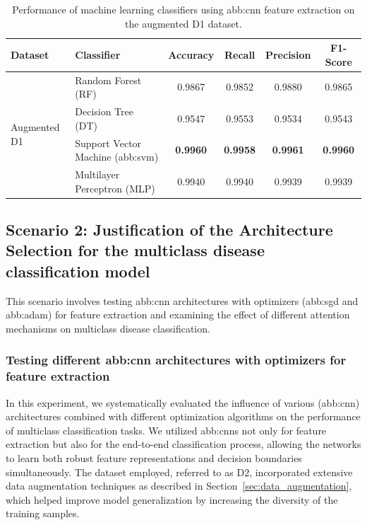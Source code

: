 \begin{table}[H]
    \centering
    \renewcommand{\arraystretch}{1.4}
    \setlength{\tabcolsep}{10pt}
    \caption{Performance of machine learning classifiers using \gls{abb:cnn} feature extraction on the augmented D1 dataset.}
    \label{tab:performance}
    \begin{tabular}{|p{2.5cm}|p{4cm}|c|c|c|c|}
        \hline
        \textbf{Dataset} & \textbf{Classifier} & \textbf{Accuracy} & \textbf{Recall} & \textbf{Precision} & \textbf{F1-Score} \\ \hline
        
        \multirow{4}{*}{Augmented D1} 
        & Random Forest (RF) & 0.9867 & 0.9852 & 0.9880 & 0.9865 \\ \cline{2-6}
        & Decision Tree (DT) & 0.9547 & 0.9553 & 0.9534 & 0.9543 \\ \cline{2-6}
        & Support Vector Machine (\gls{abb:svm}) & \textbf{0.9960} & \textbf{0.9958} & \textbf{0.9961} & \textbf{0.9960} \\ \cline{2-6}
        & Multilayer Perceptron (MLP) & 0.9940 & 0.9940 & 0.9939 & 0.9939 \\ \hline
    \end{tabular}
\end{table}





\subsection{Scenario 2: Justification of the Architecture Selection for the multiclass disease classification model}
This scenario involves testing \gls{abb:cnn} architectures with optimizers (\gls{abb:sgd} and \gls{abb:adam}) for feature extraction and examining the effect of different attention mechanisms on multiclass disease classification.

\subsubsection{Testing different \gls{abb:cnn} architectures with optimizers for feature extraction}
\label{sec:TestCnnM2}
In this experiment, we systematically evaluated the influence of various (\gls{abb:cnn}) architectures combined with different optimization algorithms on the performance of multiclass classification tasks. We utilized \gls{abb:cnn}s not only for feature extraction but also for the end-to-end classification process, allowing the networks to learn both robust feature representations and decision boundaries simultaneously. The dataset employed, referred to as D2, incorporated extensive data augmentation techniques as described in Section~\ref{sec:data_augmentation}, which helped improve model generalization by increasing the diversity of the training samples.

